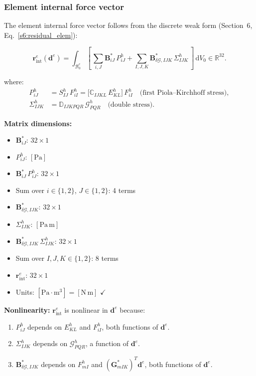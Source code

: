 \documentclass[11pt]{article}
\begin{document}
\subsubsection{Element internal force vector}

The element internal force vector follows from the discrete weak form
(Section~6, Eq.~\eqref{s6:residual_elem}):

\begin{equation}
\boxed{
\mathbf{r}_{\mathrm{int}}^{e}(\mathbf{d}^{e})
= \int_{\mathcal{B}_{0}^{e}}
  \left[\,\sum_{i,J}\mathbf{B}_{iJ}^{*}\,P_{iJ}^{h}
  + \sum_{I,J,K}\mathbf{B}_{\delta\mathcal{G},IJK}^{*}\,\Sigma_{IJK}^{h}\,\right]\,
  \mathrm{d}V_{0}
\in \mathbb{R}^{32}.
}
\label{s7:r_int}
\end{equation}

where:
\begin{align}
P_{iJ}^{h} &= S_{IJ}^{h}\,F_{iI}^{h}
= \bigl[\mathbb{C}_{IJKL}\,E_{KL}^{h}\bigr]\,F_{iI}^{h}
\quad\text{(first Piola--Kirchhoff stress)},
\label{s7:P_h}\\
\Sigma_{IJK}^{h} &= \mathbb{D}_{IJKPQR}\,\mathcal{G}_{PQR}^{h}
\quad\text{(double stress)}.
\label{s7:Sig_h}
\end{align}

\textbf{Matrix dimensions:}
\begin{itemize}
\item $\mathbf{B}_{iJ}^{*}$: $32\times 1$
\item $P_{iJ}^{h}$: $[\mathrm{Pa}]$
\item $\mathbf{B}_{iJ}^{*}\,P_{iJ}^{h}$: $32\times 1$
\item Sum over $i\in\{1,2\}$, $J\in\{1,2\}$: 4 terms
\item $\mathbf{B}_{\delta\mathcal{G},IJK}^{*}$: $32\times 1$
\item $\Sigma_{IJK}^{h}$: $[\mathrm{Pa\,m}]$
\item $\mathbf{B}_{\delta\mathcal{G},IJK}^{*}\,\Sigma_{IJK}^{h}$: $32\times 1$
\item Sum over $I,J,K\in\{1,2\}$: 8 terms
\item $\mathbf{r}_{\mathrm{int}}^{e}$: $32\times 1$
\item Units: $[\mathrm{Pa}\cdot\mathrm{m}^{3}] = [\mathrm{N\,m}]$ $\checkmark$
\end{itemize}

\textbf{Nonlinearity:}
$\mathbf{r}_{\mathrm{int}}^{e}$ is nonlinear in $\mathbf{d}^{e}$
because:
\begin{enumerate}
\item $P_{iJ}^{h}$ depends on $E_{KL}^{h}$ and $F_{iI}^{h}$, both
  functions of $\mathbf{d}^{e}$.
\item $\Sigma_{IJK}^{h}$ depends on $\mathcal{G}_{PQR}^{h}$, a
  function of $\mathbf{d}^{e}$.
\item $\mathbf{B}_{\delta\mathcal{G},IJK}^{*}$ depends on $F_{mI}^{h}$
  and $(\mathbf{G}_{mIK}^{*})^{T}\mathbf{d}^{e}$, both functions of
  $\mathbf{d}^{e}$.
\end{enumerate}
\end{document}
